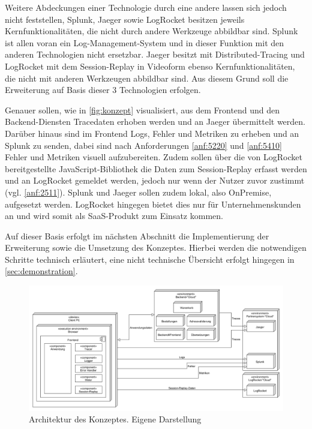Weitere Abdeckungen einer Technologie durch eine andere lassen sich jedoch nicht feststellen, Splunk, Jaeger sowie LogRocket besitzen jeweils Kernfunktionalitäten, die nicht durch andere Werkzeuge abbildbar sind. Splunk ist allen voran ein Log-Management-System und in dieser Funktion mit den anderen Technologien nicht ersetzbar. Jaeger besitzt mit Distributed-Tracing und LogRocket mit dem Session-Replay in Videoform ebenso Kernfunktionalitäten, die nicht mit anderen Werkzeugen abbildbar sind. Aus diesem Grund soll die Erweiterung auf Basis dieser 3 Technologien erfolgen.

Genauer sollen, wie in \autoref{fig:konzept} visualisiert, aus dem Frontend und den Backend-Diensten Tracedaten erhoben werden und an Jaeger übermittelt werden. Darüber hinaus sind im Frontend Logs, Fehler und Metriken zu erheben und an Splunk zu senden, dabei sind nach Anforderungen \ref*{anf:5220} und \ref*{anf:5410} Fehler und Metriken visuell aufzubereiten. Zudem sollen über die von LogRocket bereitgestellte JavaScript-Bibliothek die Daten zum Session-Replay erfasst werden und an LogRocket gemeldet werden, jedoch nur wenn der Nutzer zuvor zustimmt (vgl. \autoref{anf:2511}). Splunk und Jaeger sollen zudem lokal, also OnPremise, aufgesetzt werden. LogRocket hingegen bietet dies nur für Unternehmenskunden an und wird somit als SaaS-Produkt zum Einsatz kommen.

Auf dieser Basis erfolgt im nächsten Abschnitt die Implementierung der Erweiterung sowie die Umsetzung des Konzeptes. Hierbei werden die notwendigen Schritte technisch erläutert, eine nicht technische Übersicht erfolgt hingegen in \autoref{sec:demonstration}.

\begin{figure}[H]
	\centering
	\includegraphics[width=\linewidth]{img/04_erstellung-poc/konzept.png}
	\caption{Architektur des Konzeptes. Eigene Darstellung}
	\label{fig:konzept}
\end{figure}

\vspace{-1\baselineskip}